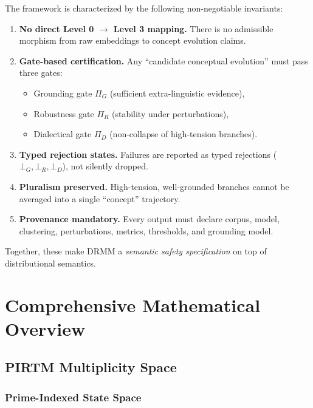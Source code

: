 \documentclass[11pt, a4paper]{article}
\begin{document}
The framework is characterized by the following non-negotiable invariants:
\begin{enumerate}[nosep]
  \item \textbf{No direct Level 0 $\to$ Level 3 mapping.} There is no admissible morphism from raw embeddings to concept evolution claims.
  \item \textbf{Gate-based certification.} Any ``candidate conceptual evolution'' must pass three gates:
    \begin{itemize}[nosep]
      \item Grounding gate $\Pi_G$ (sufficient extra-linguistic evidence),
      \item Robustness gate $\Pi_R$ (stability under perturbations),
      \item Dialectical gate $\Pi_D$ (non-collapse of high-tension branches).
    \end{itemize}
  \item \textbf{Typed rejection states.} Failures are reported as typed rejections ($\bot_G,\bot_R,\bot_D$), not silently dropped.
  \item \textbf{Pluralism preserved.} High-tension, well-grounded branches cannot be averaged into a single ``concept'' trajectory.
  \item \textbf{Provenance mandatory.} Every output must declare corpus, model, clustering, perturbations, metrics, thresholds, and grounding model.
\end{enumerate}

Together, these make DRMM a \emph{semantic safety specification} on top of distributional semantics.

\section{Comprehensive Mathematical Overview}

\subsection{PIRTM Multiplicity Space}

\subsubsection*{Prime-Indexed State Space}
\end{document}
